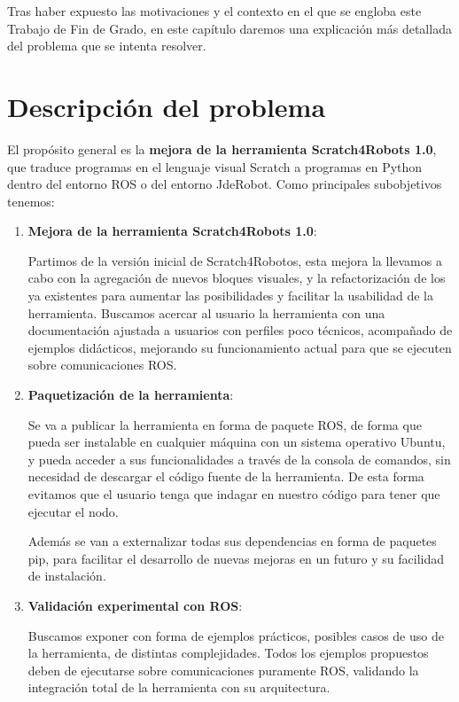 Tras haber expuesto las motivaciones y el contexto en el que se engloba este Trabajo de Fin de Grado, en este capítulo daremos una explicación más detallada del problema que se intenta resolver.\\ 

\section{Descripción del problema}
\label{sec:descripcion del problema}
El propósito general es la \textbf{mejora de la herramienta Scratch4Robots 1.0}, que traduce programas en el lenguaje visual Scratch a programas en Python dentro del entorno ROS o del entorno JdeRobot. Como principales subobjetivos tenemos:
\begin{enumerate}
\item \textbf{Mejora de la herramienta Scratch4Robots 1.0}:

Partimos de la versión inicial de Scratch4Robotos, esta mejora la llevamos a cabo con la agregación de nuevos bloques visuales, y la refactorización de los ya existentes para aumentar las posibilidades y facilitar la usabilidad de la herramienta. Buscamos acercar al usuario la herramienta con una documentación ajustada a usuarios con perfiles poco técnicos, acompañado de ejemplos didácticos, mejorando su funcionamiento actual para que se ejecuten sobre comunicaciones ROS.

\item \textbf{Paquetización de la herramienta}:

Se va a publicar la herramienta en forma de paquete ROS, de forma que pueda ser instalable en cualquier máquina con un sistema operativo Ubuntu, y pueda acceder a sus funcionalidades a través de la consola de comandos, sin necesidad de descargar el código fuente de la herramienta. De esta forma evitamos que el usuario tenga que indagar en nuestro código para tener que ejecutar el nodo.

Además se van a externalizar todas sus dependencias en forma de paquetes pip, para facilitar el desarrollo de nuevas mejoras en un futuro y su facilidad de instalación.

\item \textbf{Validación experimental con ROS}:

Buscamos exponer con forma de ejemplos prácticos, posibles casos de uso de la herramienta, de distintas complejidades. Todos los ejemplos propuestos deben de ejecutarse sobre comunicaciones puramente ROS, validando la integración total de la herramienta con su arquitectura.
\end{enumerate}


